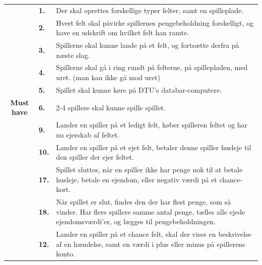 \begin{center}
    \begin{tabular}{ || c | l | p{11.5cm} ||}
        \hline
        \hline
    &        
    \textbf{1.}
    &
    Der skal oprettes forskellige typer felter, samt en spilleplade. \\

    \cline{2-3}
    &
    \textbf{2.}
    & 
    Hvert felt skal påvirke spillernes pengebeholdning forskelligt, og have en udskrift om hvilket felt han ramte. \\
    
    \cline{2-3}
    &
    \textbf{3.}
    &
    Spillerne skal kunne lande på et felt, og fortsætte derfra på næste slag. \\

    \cline{2-3}
    &
    \textbf{4.}
    &
    Spillerne skal gå i ring rundt på felterne, på spillepladen, med uret. (man kan ikke gå mod uret) \\

    \cline{2-3}
    &
    \textbf{5.} 
    &
    Spillet skal kunne køre på DTU’s databar-computere. \\
    
    \cline{2-3}
    \textbf{Must have}
    &
    \textbf{6.}
    &
    2-4 spillere skal kunne spille spillet. \\
    
    \cline{2-3}
    &
    \textbf{9.}
    &
    Lander en spiller på et ledigt felt, køber spilleren feltet og 
    har nu ejerskab af feltet. \\

    \cline{2-3}
    &
    \textbf{10.}
    &
    Lander en spiller på et ejet felt, betaler denne spiller husleje til den spiller der ejer feltet. \\

    \cline{2-3}
    &
    \textbf{17.}
    &
    Spillet sluttes, når en spiller ikke har penge nok til at betale husleje, betale en ejendom, eller negativ værdi på et chance-kort. \\

    \cline{2-3}
    &
    \textbf{18.}
    &
    Når spillet er slut, findes den der har flest penge, som så vinder. Har flere spillere samme antal penge, tælles alle ejede ejendomsværdi’er, og lægges til pengebeholdningen. \\
    
    \hline
    \hline
    &
    \textbf{12.}
    &
    Lander en spiller på et chance felt, skal der vises en beskrivelse af en hændelse, samt en værdi i plus eller minus på spillerens konto. \\
    

\end{tabular}
\end{center}

